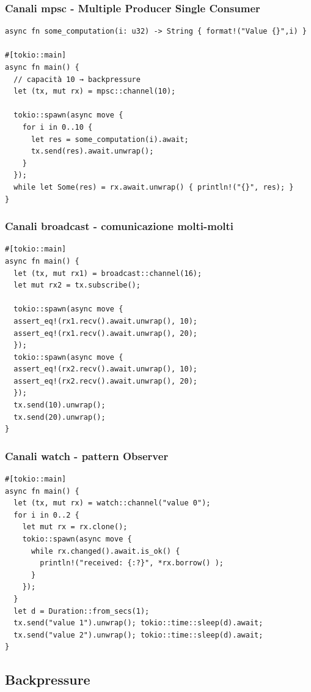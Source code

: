 \subsubsection{Canali mpsc - Multiple Producer Single Consumer}

\begin{verbatim}
async fn some_computation(i: u32) -> String { format!("Value {}",i) }

#[tokio::main]
async fn main() {
  // capacità 10 → backpressure
  let (tx, mut rx) = mpsc::channel(10);

  tokio::spawn(async move {
    for i in 0..10 {
      let res = some_computation(i).await;
      tx.send(res).await.unwrap();
    }
  });
  while let Some(res) = rx.await.unwrap() { println!("{}", res); }
}
\end{verbatim}

\subsubsection{Canali broadcast - comunicazione molti-molti}

\begin{verbatim}
#[tokio::main]
async fn main() {
  let (tx, mut rx1) = broadcast::channel(16);
  let mut rx2 = tx.subscribe();

  tokio::spawn(async move {
  assert_eq!(rx1.recv().await.unwrap(), 10);
  assert_eq!(rx1.recv().await.unwrap(), 20);
  });
  tokio::spawn(async move {
  assert_eq!(rx2.recv().await.unwrap(), 10);
  assert_eq!(rx2.recv().await.unwrap(), 20);
  });
  tx.send(10).unwrap();
  tx.send(20).unwrap();
}
\end{verbatim}

\subsubsection{Canali watch - pattern Observer}
\begin{verbatim}
#[tokio::main]
async fn main() {
  let (tx, mut rx) = watch::channel("value 0");
  for i in 0..2 {
    let mut rx = rx.clone();
    tokio::spawn(async move {
      while rx.changed().await.is_ok() {
        println!("received: {:?}", *rx.borrow() );
      }
    });
  }
  let d = Duration::from_secs(1);
  tx.send("value 1").unwrap(); tokio::time::sleep(d).await;
  tx.send("value 2").unwrap(); tokio::time::sleep(d).await;
}
\end{verbatim}

\subsection{Backpressure}

